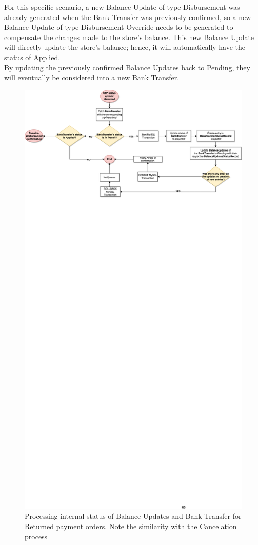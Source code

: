 For this specific scenario, a new Balance Update of type Disbursement was already generated when the Bank Transfer was previously confirmed, so a new Balance Update of type Disbursement Override needs to be generated to compensate the changes made to the store’s balance. This new Balance Update will directly update the store’s balance; hence, it will automatically have the status of Applied.\\

By updating the previously confirmed Balance Updates back to Pending, they will eventually be considered into a new Bank Transfer.

\begin{figure} [h]
    \centering
    \includegraphics[scale = 0.4]{assets/diagrams/ReturnedStatusUpdate.png}
    \caption{Processing internal status of Balance Updates and Bank Transfer for Returned payment orders. Note the similarity with the Cancelation process}\label{fig:returned_status_update}
\end{figure}
